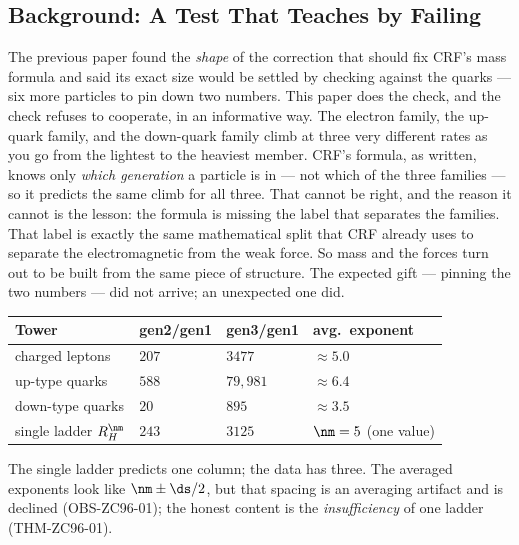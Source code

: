\documentclass[12pt, a4paper]{article}
\begin{document}
\subsection{Background: A Test That Teaches by Failing}
\label{sec:background-zc96}

\begin{keybox}[title={If you are just arriving --- ZC96 in plain language}]
\sloppy
The previous paper found the \emph{shape} of the correction that should fix
CRF's mass formula and said its exact size would be settled by checking against
the quarks --- six more particles to pin down two numbers. This paper does the
check, and the check refuses to cooperate, in an informative way. The electron
family, the up-quark family, and the down-quark family climb at three very
different rates as you go from the lightest to the heaviest member. CRF's
formula, as written, knows only \emph{which generation} a particle is in --- not
which of the three families --- so it predicts the same climb for all three.
That cannot be right, and the reason it cannot is the lesson: the formula is
missing the label that separates the families. That label is exactly the same
mathematical split that CRF already uses to separate the electromagnetic from
the weak force. So mass and the forces turn out to be built from the same piece
of structure. The expected gift --- pinning the two numbers --- did not arrive;
an unexpected one did.
\end{keybox}

\begin{keybox}[title={Numerical Summary --- three towers, one ladder}]
{\footnotesize\renewcommand{\arraystretch}{1.3}
\begin{center}
\begin{tabular}{@{}p{3.6cm}p{2.6cm}p{2.6cm}p{2.6cm}@{}}
\toprule
\textbf{Tower} & \textbf{gen2/gen1} & \textbf{gen3/gen1} & \textbf{avg.\ exponent} \\
\midrule
charged leptons & $207$    & $3477$    & $\approx 5.0$ \\
up-type quarks  & $588$    & $79{,}981$& $\approx 6.4$ \\
down-type quarks& $20$     & $895$     & $\approx 3.5$ \\
\midrule
single ladder $R_H^{\nm}$ & $243$ & $3125$ & $\nm=5$ (one value) \\
\bottomrule
\end{tabular}
\end{center}}
\smallskip
\footnotesize The single ladder predicts one column; the data has three.
The averaged exponents look like $\nm\pm\ds/2$, but that spacing is an
averaging artifact and is declined (OBS-ZC96-01); the honest content is the
\emph{insufficiency} of one ladder (THM-ZC96-01).
\end{keybox}
\end{document}
